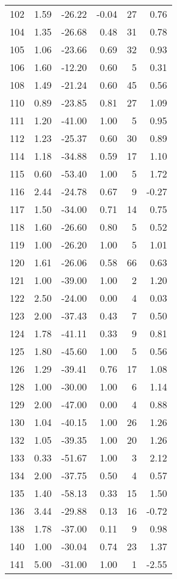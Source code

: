 \begin{appendices}
\begin{longtable}[c]{@{}rrrrrr@{}}
102 & 1.59 & -26.22 & -0.04 & 27 & 0.76 \\
104 & 1.35 & -26.68 & 0.48 & 31 & 0.78 \\
105 & 1.06 & -23.66 & 0.69 & 32 & 0.93 \\
106 & 1.60 & -12.20 & 0.60 & 5 & 0.31 \\
108 & 1.49 & -21.24 & 0.60 & 45 & 0.56 \\
110 & 0.89 & -23.85 & 0.81 & 27 & 1.09 \\
111 & 1.20 & -41.00 & 1.00 & 5 & 0.95 \\
112 & 1.23 & -25.37 & 0.60 & 30 & 0.89 \\
114 & 1.18 & -34.88 & 0.59 & 17 & 1.10 \\
115 & 0.60 & -53.40 & 1.00 & 5 & 1.72 \\
116 & 2.44 & -24.78 & 0.67 & 9 & -0.27 \\
117 & 1.50 & -34.00 & 0.71 & 14 & 0.75 \\
118 & 1.60 & -26.60 & 0.80 & 5 & 0.52 \\
119 & 1.00 & -26.20 & 1.00 & 5 & 1.01 \\
120 & 1.61 & -26.06 & 0.58 & 66 & 0.63 \\
121 & 1.00 & -39.00 & 1.00 & 2 & 1.20 \\
122 & 2.50 & -24.00 & 0.00 & 4 & 0.03 \\
123 & 2.00 & -37.43 & 0.43 & 7 & 0.50 \\
124 & 1.78 & -41.11 & 0.33 & 9 & 0.81 \\
125 & 1.80 & -45.60 & 1.00 & 5 & 0.56 \\
126 & 1.29 & -39.41 & 0.76 & 17 & 1.08 \\
128 & 1.00 & -30.00 & 1.00 & 6 & 1.14 \\
129 & 2.00 & -47.00 & 0.00 & 4 & 0.88 \\
130 & 1.04 & -40.15 & 1.00 & 26 & 1.26 \\
132 & 1.05 & -39.35 & 1.00 & 20 & 1.26 \\
133 & 0.33 & -51.67 & 1.00 & 3 & 2.12 \\
134 & 2.00 & -37.75 & 0.50 & 4 & 0.57 \\
135 & 1.40 & -58.13 & 0.33 & 15 & 1.50 \\
136 & 3.44 & -29.88 & 0.13 & 16 & -0.72 \\
138 & 1.78 & -37.00 & 0.11 & 9 & 0.98 \\
140 & 1.00 & -30.04 & 0.74 & 23 & 1.37 \\
141 & 5.00 & -31.00 & 1.00 & 1 & -2.55 \\

\end{longtable}
\end{appendices}
